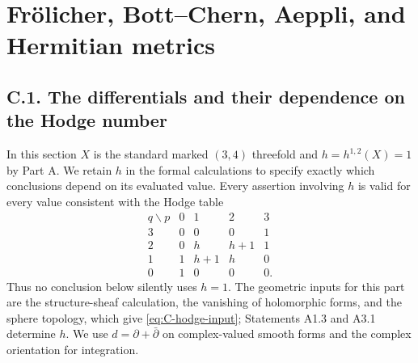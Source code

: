 \section{Fr\"olicher, Bott--Chern, Aeppli, and Hermitian metrics}
\label{sec:partC}

\subsection{C.1. The differentials and their dependence on the Hodge number}

In this section $X$ is the standard marked $(3,4)$ threefold and
$h=h^{1,2}(X)=1$ by Part A.  We retain $h$ in the formal calculations
to specify exactly which conclusions depend on its evaluated value.
Every assertion involving $h$ is valid for every value
consistent with the Hodge table
\begin{equation}\label{eq:C-hodge-input}
\begin{array}{c|rrrr}
q\backslash p&0&1&2&3\\\hline
3&0&0&0&1\\
2&0&h&h+1&1\\
1&1&h+1&h&0\\
0&1&0&0&0.
\end{array}
\end{equation}
Thus no conclusion below silently uses $h=1$.  The geometric inputs for
this part are the structure-sheaf calculation, the vanishing of
holomorphic forms, and the sphere topology, which give
\eqref{eq:C-hodge-input}; Statements A1.3 and A3.1 determine $h$.
We use $d=\partial+\bar\partial$ on complex-valued
smooth forms and the complex orientation for integration.

